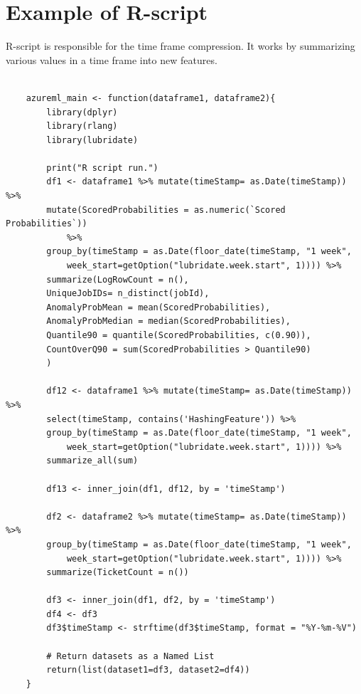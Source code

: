 \clearpage


\section{Example of R-script}\label{sec:app-r-script}
R-script is responsible for the time frame compression.
It works by summarizing various values in a time frame into new features.

\begin{Verbatim}[fontsize=\small]

    azureml_main <- function(dataframe1, dataframe2){
        library(dplyr)
        library(rlang)
        library(lubridate)

        print("R script run.")
        df1 <- dataframe1 %>% mutate(timeStamp= as.Date(timeStamp)) %>%
        mutate(ScoredProbabilities = as.numeric(`Scored Probabilities`))
            %>%
        group_by(timeStamp = as.Date(floor_date(timeStamp, "1 week",
            week_start=getOption("lubridate.week.start", 1)))) %>%
        summarize(LogRowCount = n(),
        UniqueJobIDs= n_distinct(jobId),
        AnomalyProbMean = mean(ScoredProbabilities),
        AnomalyProbMedian = median(ScoredProbabilities),
        Quantile90 = quantile(ScoredProbabilities, c(0.90)),
        CountOverQ90 = sum(ScoredProbabilities > Quantile90)
        )

        df12 <- dataframe1 %>% mutate(timeStamp= as.Date(timeStamp)) %>%
        select(timeStamp, contains('HashingFeature')) %>%
        group_by(timeStamp = as.Date(floor_date(timeStamp, "1 week",
            week_start=getOption("lubridate.week.start", 1)))) %>%
        summarize_all(sum)

        df13 <- inner_join(df1, df12, by = 'timeStamp')

        df2 <- dataframe2 %>% mutate(timeStamp= as.Date(timeStamp)) %>%
        group_by(timeStamp = as.Date(floor_date(timeStamp, "1 week",
            week_start=getOption("lubridate.week.start", 1)))) %>%
        summarize(TicketCount = n())

        df3 <- inner_join(df1, df2, by = 'timeStamp')
        df4 <- df3
        df3$timeStamp <- strftime(df3$timeStamp, format = "%Y-%m-%V")

        # Return datasets as a Named List
        return(list(dataset1=df3, dataset2=df4))
    }
\end{Verbatim}

\clearpage




